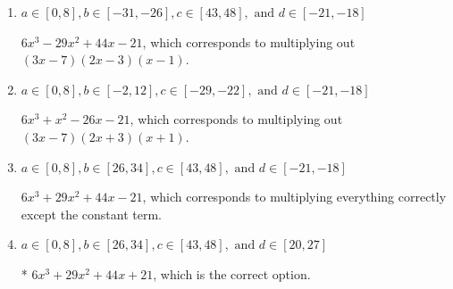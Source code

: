 \documentclass{extbook}[14pt]
\begin{document}
\begin{enumerate}
{\begin{enumerate}[label=\Alph*.]
$6x^{3} -17 x^{2} -2 x + 21$, which corresponds to multiplying out $(3x -7)(2x -3)(x + 1)$.
\item \( a \in [0, 8], b \in [-31, -26], c \in [43, 48], \text{ and } d \in [-21, -18] \)

$6x^{3} -29 x^{2} +44 x -21$, which corresponds to multiplying out $(3x -7)(2x -3)(x -1)$.
\item \( a \in [0, 8], b \in [-2, 12], c \in [-29, -22], \text{ and } d \in [-21, -18] \)

$6x^{3} + x^{2} -26 x -21$, which corresponds to multiplying out $(3x -7)(2x + 3)(x + 1)$.
\item \( a \in [0, 8], b \in [26, 34], c \in [43, 48], \text{ and } d \in [-21, -18] \)

$6x^{3} +29 x^{2} +44 x -21$, which corresponds to multiplying everything correctly except the constant term.
\item \( a \in [0, 8], b \in [26, 34], c \in [43, 48], \text{ and } d \in [20, 27] \)

* $6x^{3} +29 x^{2} +44 x + 21$, which is the correct option.
\end{enumerate}

}
\end{enumerate}
\end{document}
